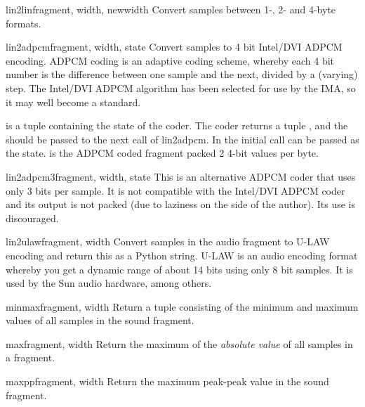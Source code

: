 \begin{funcdesc}{lin2lin}{fragment, width, newwidth}
Convert samples between 1-, 2- and 4-byte formats.
\end{funcdesc}

\begin{funcdesc}{lin2adpcm}{fragment, width, state}
Convert samples to 4 bit Intel/DVI ADPCM encoding.  ADPCM coding is an
adaptive coding scheme, whereby each 4 bit number is the difference
between one sample and the next, divided by a (varying) step.  The
Intel/DVI ADPCM algorithm has been selected for use by the IMA, so it
may well become a standard.

 is a tuple containing the state of the coder.  The coder
returns a tuple , and the
 should be passed to the next call of lin2adpcm.  In the
initial call  can be passed as the state.  
is the ADPCM coded fragment packed 2 4-bit values per byte.
\end{funcdesc}

\begin{funcdesc}{lin2adpcm3}{fragment, width, state}
This is an alternative ADPCM coder that uses only 3 bits per sample.
It is not compatible with the Intel/DVI ADPCM coder and its output is
not packed (due to laziness on the side of the author).  Its use is
discouraged.
\end{funcdesc}

\begin{funcdesc}{lin2ulaw}{fragment, width}
Convert samples in the audio fragment to U-LAW encoding and return
this as a Python string.  U-LAW is an audio encoding format whereby
you get a dynamic range of about 14 bits using only 8 bit samples.  It
is used by the Sun audio hardware, among others.
\end{funcdesc}

\begin{funcdesc}{minmax}{fragment, width}
Return a tuple consisting of the minimum and maximum values of all
samples in the sound fragment.
\end{funcdesc}

\begin{funcdesc}{max}{fragment, width}
Return the maximum of the \emph{absolute value} of all samples in a
fragment.
\end{funcdesc}

\begin{funcdesc}{maxpp}{fragment, width}
Return the maximum peak-peak value in the sound fragment.
\end{funcdesc}

